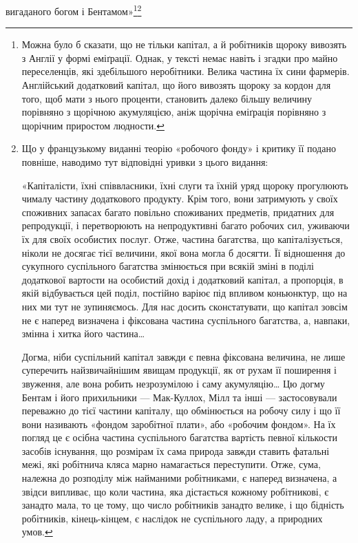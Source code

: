 вигаданого богом і Бентамом»\footnote{
Можна було б сказати, що не тільки капітал, а й робітників щороку
вивозять з Англії у формі еміґрації. Однак, у тексті немає навіть і згадки
про майно переселенців, які здебільшого неробітники. Велика частина
їх сини фармерів. Англійський додатковий капітал, що його вивозять
щороку за кордон для того, щоб мати з нього проценти, становить далеко
більшу величину порівняно з щорічною акумуляцією, аніж щорічна
еміґрація порівняно з щорічним приростом людности.
}\footnote*{
Що у французькому виданні теорію «робочого фонду» і критику
її подано повніше, наводимо тут відповідні уривки з цього видання:

«Капіталісти, їхні співвласники, їхні слуги та їхній уряд щороку
прогулюють чималу частину додаткового продукту. Крім того, вони
затримують у своїх споживних запасах багато повільно споживаних
предметів, придатних для репродукції, і перетворюють на непродуктивні
багато робочих сил, уживаючи їх для своїх особистих послуг.
Отже, частина багатства, що капіталізується, ніколи не досягає тієї
величини, якої вона могла б досягти. Її відношення до сукупного суспільного
багатства змінюється при всякій зміні в поділі додаткової вартости
на особистий дохід і додатковий капітал, а пропорція, в якій відбувається
цей поділ, постійно варіює під впливом коньюнктур, що на них ми
тут не зупиняємось. Для нас досить сконстатувати, що капітал зовсім
не є наперед визначена і фіксована частина суспільного багатства, а,
навпаки, змінна і хитка його частина\dots{}

Догма, ніби суспільний капітал завжди є певна фіксована величина,
не лише суперечить найзвичайнішим явищам продукції, як от рухам її
поширення і звуження, але вона робить незрозумілою і саму акумуляцію\dots{}
Цю догму Бентам і його прихильники — Мак-Куллох, Мілл та інші —
застосовували переважно до тієї частини капіталу, що обмінюється на
робочу силу і що її вони називають «фондом заробітної плати», або «робочим
фондом». На їх погляд це є осібна частина суспільного багатства
вартість певної кількости засобів існування, що розмірам їх сама природа
завжди ставить фатальні межі, які робітнича кляса марно намагається
переступити. Отже, сума, належна до розподілу між найманими робітниками,
є наперед визначена, а звідси випливає, що коли частина, яка
дістається кожному робітникові, є занадто мала, то це тому, що число
робітників занадто велике, і що бідність робітників, кінець-кінцем,
є наслідок не суспільного ладу, а природних умов.

}
